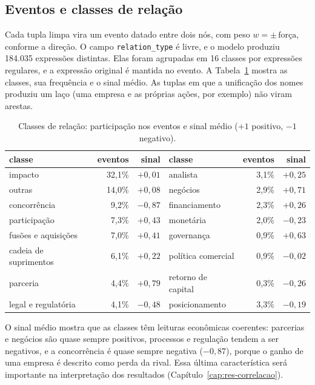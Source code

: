 \subsection{Eventos e classes de relação}

Cada tupla limpa vira um evento datado entre dois nós, com peso $w=\pm\,\text{força}$, conforme a
direção. O campo \texttt{relation\_type} é livre, e o modelo produziu 184.035 expressões distintas.
Elas foram agrupadas em 16 classes por expressões regulares, e a expressão original é mantida no
evento. A Tabela~\ref{tab:classes} mostra as classes, sua frequência e o sinal médio. As tuplas em que a
unificação dos nomes produziu um laço (uma empresa e as próprias ações, por exemplo) não viram arestas.

\begin{table}[htbp]
\centering
\small
\caption{Classes de relação: participação nos eventos e sinal médio ($+1$ positivo, $-1$ negativo).}
\label{tab:classes}
\begin{tabular}{lrr@{\hspace{2.5em}}lrr}
\toprule
classe & eventos & sinal & classe & eventos & sinal \\
\midrule
impacto & 32,1\% & $+0{,}01$ & analista & 3,1\% & $+0{,}25$ \\
outras & 14,0\% & $+0{,}08$ & negócios & 2,9\% & $+0{,}71$ \\
concorrência & 9,2\% & $-0{,}87$ & financiamento & 2,3\% & $+0{,}26$ \\
participação & 7,3\% & $+0{,}43$ & monetária & 2,0\% & $-0{,}23$ \\
fusões e aquisições & 7,0\% & $+0{,}41$ & governança & 0,9\% & $+0{,}63$ \\
cadeia de suprimentos & 6,1\% & $+0{,}22$ & política comercial & 0,9\% & $-0{,}02$ \\
parceria & 4,4\% & $+0{,}79$ & retorno de capital & 0,3\% & $-0{,}26$ \\
legal e regulatória & 4,1\% & $-0{,}48$ & posicionamento & 3,3\% & $-0{,}19$ \\
\bottomrule
\end{tabular}
\end{table}

O sinal médio mostra que as classes têm leituras econômicas coerentes: parcerias e negócios são quase
sempre positivos, processos e regulação tendem a ser negativos, e a concorrência é quase sempre
negativa ($-0{,}87$), porque o ganho de uma empresa é descrito como perda da rival. Essa última
característica será importante na interpretação dos resultados (Capítulo~\ref{cap:res-correlacao}).

